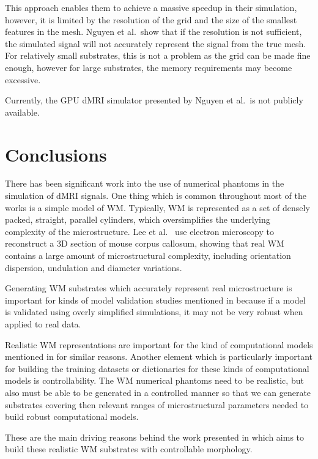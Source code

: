 This approach enables them to achieve a massive speedup in their simulation, however, it is limited by the resolution of the grid and the size of the smallest features in the mesh.
Nguyen et al.\ show that if the resolution is not sufficient, the simulated signal will not accurately represent the signal from the true mesh.
For relatively small substrates, this is not a problem as the grid can be made fine enough, however for large substrates, the memory requirements may become excessive.

Currently, the \ac{GPU} \ac{dMRI} simulator presented by Nguyen et al.\ is not publicly available. 


\section{Conclusions}
\label{sec:review_conclusions}
There has been significant work into the use of numerical phantoms in the simulation of \acl{dMRI} signals.
One thing which is common throughout most of the works is a simple model of \ac{WM}.
Typically, \ac{WM} is represented as a set of densely packed, straight, parallel cylinders, which oversimplifies the underlying complexity of the microstructure.
Lee et al.\ \cite{Lee2018a} use electron microscopy to reconstruct a 3D section of mouse corpus callosum, showing that real \ac{WM} contains a large amount of microstructural complexity, including orientation dispersion, undulation and diameter variations.

Generating \ac{WM} substrates which accurately represent real microstructure is important for kinds of model validation studies mentioned in  because if a model is validated using overly simplified simulations, it may not be very robust when applied to real data.

Realistic \ac{WM} representations are important for the kind of computational models mentioned in  for similar reasons.
Another element which is particularly important for building the training datasets or dictionaries for these kinds of computational models is controllability.
The \ac{WM} numerical phantoms need to be realistic, but also must be able to be generated in a controlled manner so that we can generate substrates covering then relevant ranges of microstructural parameters needed to build robust computational models.

These are the main driving reasons behind the work presented in  which aims to build these realistic \ac{WM} substrates with controllable morphology. 


